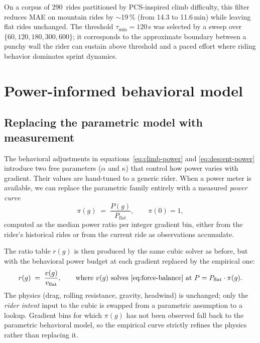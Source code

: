 \documentclass[11pt,a4paper]{article}
\begin{document}
On a corpus of 290~rides partitioned by PCS-inspired climb
difficulty, this filter reduces MAE on mountain rides by
$\sim$19\,\% (from 14.3 to 11.6\,\si{\minute}) while leaving flat
rides unchanged. The threshold $\tau_\text{min} = 120$\,\si{\second}
was selected by a sweep over $\{60, 120, 180, 300, 600\}$; it
corresponds to the approximate boundary between a punchy wall the
rider can sustain above threshold and a paced effort where riding
behavior dominates sprint dynamics.


\section{Power-informed behavioral model}
\label{sec:power}

\subsection{Replacing the parametric model with measurement}

The behavioral adjustments in equations~\eqref{eq:climb-power} and
\eqref{eq:descent-power} introduce two free parameters ($\alpha$ and
$\kappa$) that control how power varies with gradient. Their values
are hand-tuned to a generic rider. When a power meter is available,
we can replace the parametric family entirely with a measured
\emph{power curve}
\begin{equation}
\label{eq:pi}
\pi(g) \;=\; \frac{P(g)}{P_\text{flat}},
\qquad \pi(0) = 1,
\end{equation}
computed as the median power ratio per integer gradient bin, either
from the rider's historical rides or from the current ride as
observations accumulate.

The ratio table $r(g)$ is then produced by the same cubic solver
as before, but with the behavioral power budget at each gradient
replaced by the empirical one:
\begin{equation}
\label{eq:r-empirical}
r(g) \;=\; \frac{v(g)}{v_\text{flat}},
\qquad\text{where } v(g) \text{ solves~\eqref{eq:force-balance} at }
P = P_\text{flat} \cdot \pi(g).
\end{equation}
The physics (drag, rolling resistance, gravity, headwind) is
unchanged; only the \emph{rider intent} input to the cubic is swapped
from a parametric assumption to a lookup. Gradient bins for which
$\pi(g)$ has not been observed fall back to the parametric behavioral
model, so the empirical curve strictly refines the physics rather
than replacing it.
\end{document}
